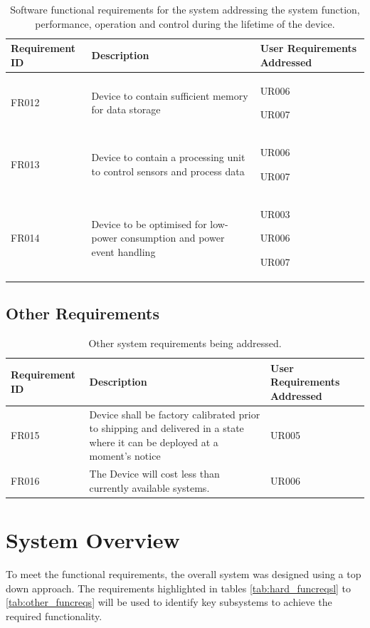 \begin{table}[H]
    \centering
    \caption{Software functional requirements for the system addressing the system function, performance, operation and control during the lifetime of the device.}
    \begin{tabular}{|>{\centering}m{}|>{\RaggedRight}m{}| >{\RaggedRight}m{} |}
    \hline
         Requirement ID & Description & User Requirements Addressed\\
         \hline
         FR012 & Device to contain sufficient memory for data storage & UR006\par UR007 \\
         \hline
         FR013 & Device to contain a processing unit to control sensors and process data & UR006\par UR007\\
         \hline
         FR014 & Device to be optimised for low-power consumption and power event handling & UR003\par UR006\par UR007  \\
         \hline
    \end{tabular}
    \label{tab: soft_funcreqsl}
\end{table}

\subsection{Other Requirements}
\begin{table}[H]
    \centering
    \caption{ Other system requirements being addressed.}
    \begin{tabular}{|>{\centering}m{}|>{\RaggedRight}m{}| >{\RaggedRight}m{} |}
    \hline
    Requirement ID & Description & User Requirements Addressed\\
    \hline
    FR015 & Device shall be factory calibrated prior to shipping and delivered in a state where it can be deployed at a moment's notice & UR005 \\
    \hline
    FR016 & The Device will cost less than currently available systems. & UR006 \\
    \hline
    \end{tabular}
    \label{tab:elec_funcreqs}
\end{table}

\section{ System Overview}
\label{sec:ch3_sysoverview}
To meet the functional requirements, the overall system was designed using a top down approach. The requirements highlighted in tables \ref{tab:hard_funcreqsl} to \ref{tab:other_funcreqs} will be used to identify key subsystems to achieve the required functionality.

